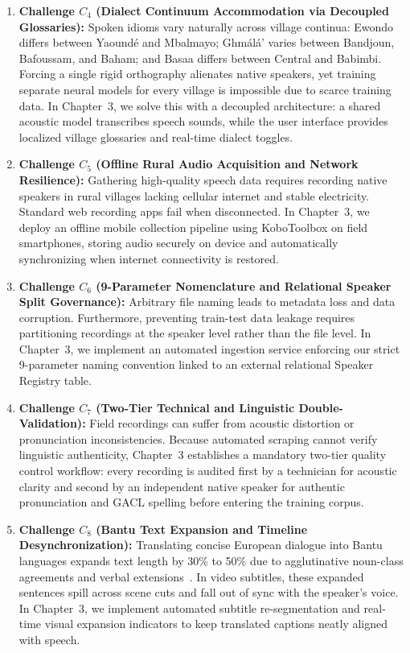 \documentclass[a4paper,11pt]{article}
\begin{document}
\begin{enumerate}
    \item \textbf{Challenge $C_4$ (Dialect Continuum Accommodation via Decoupled Glossaries):} Spoken idioms vary naturally across village continua: Ewondo differs between Yaound\'e and Mbalmayo; Gh\textopeno m\'al\'a' varies between Bandjoun, Bafoussam, and Baham; and Basaa differs between Central and Babimbi. Forcing a single rigid orthography alienates native speakers, yet training separate neural models for every village is impossible due to scarce training data. In Chapter~3, we solve this with a decoupled architecture: a shared acoustic model transcribes speech sounds, while the user interface provides localized village glossaries and real-time dialect toggles.

    \item \textbf{Challenge $C_5$ (Offline Rural Audio Acquisition and Network Resilience):} Gathering high-quality speech data requires recording native speakers in rural villages lacking cellular internet and stable electricity. Standard web recording apps fail when disconnected. In Chapter~3, we deploy an offline mobile collection pipeline using KoboToolbox on field smartphones, storing audio securely on device and automatically synchronizing when internet connectivity is restored.

    \item \textbf{Challenge $C_6$ (9-Parameter Nomenclature and Relational Speaker Split Governance):} Arbitrary file naming leads to metadata loss and data corruption. Furthermore, preventing train-test data leakage requires partitioning recordings at the speaker level rather than the file level. In Chapter~3, we implement an automated ingestion service enforcing our strict 9-parameter naming convention linked to an external relational Speaker Registry table.

    \item \textbf{Challenge $C_7$ (Two-Tier Technical and Linguistic Double-Validation):} Field recordings can suffer from acoustic distortion or pronunciation inconsistencies. Because automated scraping cannot verify linguistic authenticity, Chapter~3 establishes a mandatory two-tier quality control workflow: every recording is audited first by a technician for acoustic clarity and second by an independent native speaker for authentic pronunciation and GACL spelling before entering the training corpus.

    \item \textbf{Challenge $C_8$ (Bantu Text Expansion and Timeline Desynchronization):} Translating concise European dialogue into Bantu languages expands text length by 30\% to 50\% due to agglutinative noun-class agreements and verbal extensions~\cite{essono2000ewondo, lemb1973dictionnaire}. In video subtitles, these expanded sentences spill across scene cuts and fall out of sync with the speaker's voice. In Chapter~3, we implement automated subtitle re-segmentation and real-time visual expansion indicators to keep translated captions neatly aligned with speech.


\end{enumerate}
\end{document}
